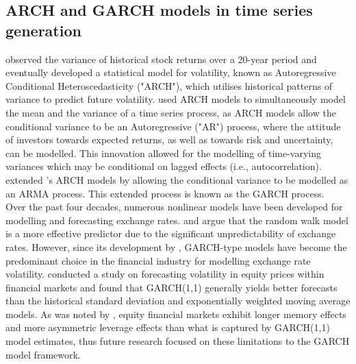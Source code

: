 \documentclass[oneside,12pt]{CUEDthesisPSnPDF}
\newcommand{\textcite}{\citet}
\begin{document}
\subsection{ARCH and GARCH models in time series generation}
\noindent
\textcite{engle1982autoregressive} observed the variance of historical stock returns over a 20-year period and eventually developed a statistical model for volatility, known as Autoregressive Conditional Heteroscedasticity ("ARCH"), which utilises historical patterns of variance to predict future volatility. \textcite{engle1982autoregressive} used ARCH models to simultaneously model the mean and the variance of a time series process, as ARCH models allow the conditional variance to be an Autoregressive ("AR") process, where the attitude of investors towards expected returns, as well as towards risk and uncertainty, can be modelled. This innovation allowed for the modelling of time-varying variances which may be conditional on lagged effects (i.e., autocorrelation). \textcite{bollerslev1986generalised} extended \textcite{engle1982autoregressive}'s ARCH models by allowing the conditional variance to be modelled as an ARMA process. This extended process is known as the GARCH process.\\

Over the past four decades, numerous nonlinear models have been developed for modelling and forecasting exchange rates. \textcite{chang1999methodical} and \textcite{gencay1999linear} argue that the random walk model is a more effective predictor due to the significant unpredictability of exchange rates. However, since its development by \textcite{bollerslev1986generalised}, GARCH-type models have become the predominant choice in the financial industry for modelling exchange rate volatility. \textcite{ederington2005forecasting} conducted a study on forecasting volatility in equity prices within financial markets and found that GARCH(1,1) generally yields better forecasts than the historical standard deviation and exponentially weighted moving average models. As was noted by \textcite{ederington2005forecasting}, equity financial markets exhibit longer memory effects and more asymmetric leverage effects than what is captured by GARCH(1,1) model estimates, thus future research focused on these limitations to the GARCH model framework.\\
\end{document}
